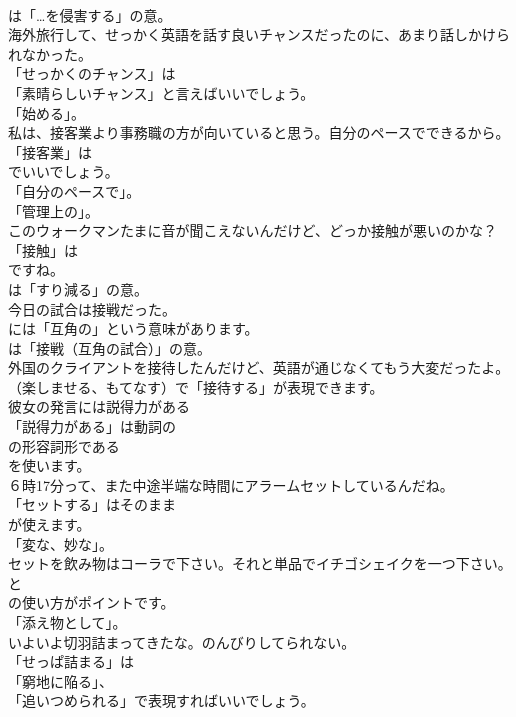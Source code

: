 \documentclass[8pt]{extreport}
\begin{document}
\begin{CJK}{UTF8}{min}
\\	は「…を侵害する」の意。	
\\	海外旅行して、せっかく英語を話す良いチャンスだったのに、あまり話しかけられなかった。 
\\	「せっかくのチャンス」は
\\	「素晴らしいチャンス」と言えばいいでしょう。
\\	「始める」。	
\\	私は、接客業より事務職の方が向いていると思う。自分のペースでできるから。 
\\	「接客業」は
\\	でいいでしょう。
\\	「自分のペースで」。
\\	「管理上の」。	
\\	このウォークマンたまに音が聞こえないんだけど、どっか接触が悪いのかな？ 
\\	「接触」は 
\\	ですね。
\\	は「すり減る」の意。	
\\	今日の試合は接戦だった。 
\\	には「互角の」という意味があります。
\\	は「接戦（互角の試合）」の意。	
\\	外国のクライアントを接待したんだけど、英語が通じなくてもう大変だったよ。 
\\	（楽しませる、もてなす）で「接待する」が表現できます。	
\\	彼女の発言には説得力がある 
\\	「説得力がある」は動詞の
\\	の形容詞形である
\\	を使います。	
\\	６時17分って、また中途半端な時間にアラームセットしているんだね。 
\\	「セットする」はそのまま
\\	が使えます。
\\	「変な、妙な」。	
\\	セットを飲み物はコーラで下さい。それと単品でイチゴシェイクを一つ下さい。 
\\	と
\\	の使い方がポイントです。
\\	「添え物として」。	
\\	いよいよ切羽詰まってきたな。のんびりしてられない。 
\\	「せっぱ詰まる」は
\\	「窮地に陥る」、
\\	「追いつめられる」で表現すればいいでしょう。	

\end{CJK}
\end{document}
